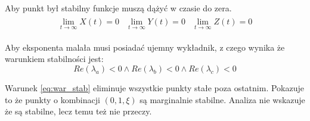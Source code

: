 Aby punkt był stabilny funkcje muszą dążyć w czasie do zera.
\begin{align}
\begin{array}{ccc}
\displaystyle\lim_{t \to \infty} X(t)=0 & \displaystyle\lim_{t \to \infty} Y(t)=0 & \displaystyle\lim_{t \to \infty} Z(t)=0
\end{array}
\end{align}

Aby eksponenta malała musi posiadać ujemny wykładnik, z czego wynika że warunkiem stabilności jest:
\begin{equation}\label{eq:war_stab}
Re(\lambda_a)<0 \wedge Re(\lambda_b)<0 \wedge Re(\lambda_c)<0
\end{equation}

Warunek \ref{eq:war_stab} eliminuje wszystkie punkty stałe poza ostatnim. Pokazuje to że punkty o kombinacji $(0,1,\xi)$ są marginalnie stabilne. Analiza nie wskazuje że są stabilne, lecz temu też nie przeczy.

